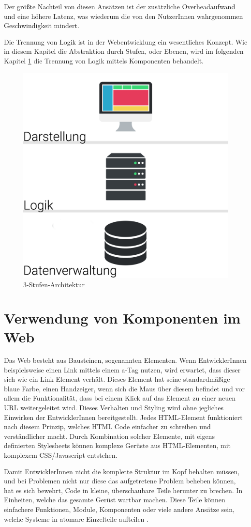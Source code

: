 Der größte Nachteil von diesen Ansätzen ist der zusätzliche Overheadaufwand und eine höhere Latenz, was wiederum die von den NutzerInnen wahrgenommen Geschwindigkeit mindert.

Die Trennung von Logik ist in der Webentwicklung ein wesentliches Konzept. Wie in diesem Kapitel die Abstraktion durch Stufen, oder Ebenen, wird im folgenden Kapitel \ref{cha:component_usage} die Trennung von Logik mittels Komponenten behandelt.

\begin{figure}
	\centering
	\includegraphics[width=0.5\linewidth]{images/3-stufen-architektur}
	\caption{3-Stufen-Architektur}
	\label{fig:3-stufen-architektur}
\end{figure}

\section{Verwendung von Komponenten im Web}
\label{cha:component_usage}

Das Web besteht aus Bausteinen, sogenannten Elementen. Wenn EntwicklerInnen beispielsweise einen Link mittels einem a-Tag nutzen, wird erwartet, dass dieser sich wie ein Link-Element verhält. Dieses Element hat seine standardmäßige blaue Farbe, einen Handzeiger, wenn sich die Maus über diesem befindet und vor allem die Funktionalität, dass bei einem Klick auf das Element zu einer neuen URL weitergeleitet wird. Dieses Verhalten und Styling wird ohne jegliches Einwirken der EntwicklerInnen bereitgestellt. Jedes HTML-Element funktioniert nach diesem Prinzip, welches HTML Code einfacher zu schreiben und verständlicher macht.
Durch Kombination solcher Elemente, mit eigens definierten Stylesheets können komplexe Gerüste aus HTML-Elementen, mit komplexem CSS/Javascript entstehen.

Damit EntwicklerInnen nicht die komplette Struktur im Kopf behalten müssen, und bei Problemen nicht nur diese das aufgetretene Problem beheben können, hat es sich bewehrt, Code in kleine, überschaubare Teile herunter zu brechen. In Einheiten, welche das gesamte Gerüst wartbar machen. Diese Teile können einfachere Funktionen, Module, Komponenten oder viele andere Ansätze sein, welche Systeme in atomare Einzelteile aufteilen \cite{components-benefit}.

